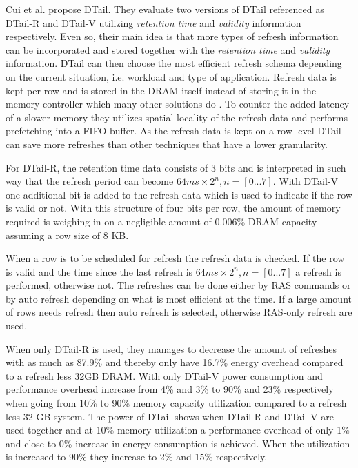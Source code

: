 Cui et al. \cite{dtail} propose DTail. They evaluate two versions of DTail referenced as DTail-R and DTail-V utilizing \textit{retention time} and \textit{validity} information respectively. Even so, their main idea is that more types of refresh information can be incorporated and stored together with the \textit{retention time} and \textit{validity} information. DTail can then choose the most efficient refresh schema depending on the current situation, i.e. workload and type of application. Refresh data is kept per row and is stored in the DRAM itself instead of storing it in the memory controller which many other solutions do \cite{raidr}\cite{smartrefresh}\cite{refrint}. To counter the added latency of a slower memory they utilizes spatial locality of the refresh data and performs prefetching into a FIFO buffer. As the refresh data is kept on a row level DTail can save more refreshes than other techniques that have a lower granularity.

For DTail-R, the retention time data consists of 3 bits and is interpreted in such way that the refresh period can become \(64ms \times 2^n, n = [0...7]\). With DTail-V one additional bit is added to the refresh data which is used to indicate if the row is valid or not. With this structure of four bits per row, the amount of memory required is weighing in on a negligible amount of 0.006\% DRAM capacity assuming a row size of 8 KB. 

When a row is to be scheduled for refresh the refresh data is checked. If the row is valid and the time since the last refresh is \(64ms \times 2^n, n = [0...7]\) a refresh is performed, otherwise not. The refreshes can be done either by RAS commands or by auto refresh depending on what is most efficient at the time. If a large amount of rows needs refresh then auto refresh is selected, otherwise RAS-only refresh are used. 

When only DTail-R is used, they manages to decrease the amount of refreshes with as much as 87.9\% and thereby only have 16.7\% energy overhead compared to a refresh less 32GB DRAM. With only DTail-V power consumption and performance overhead increase from 4\% and 3\% to 90\% and 23\% respectively when going from 10\% to 90\% memory capacity utilization compared to a refresh less 32 GB system. The power of DTail shows when DTail-R and DTail-V are used together and at 10\% memory utilization a performance overhead of only 1\% and close to 0\% increase in energy consumption is achieved. When the utilization is increased to 90\% they increase to 2\% and 15\% respectively.